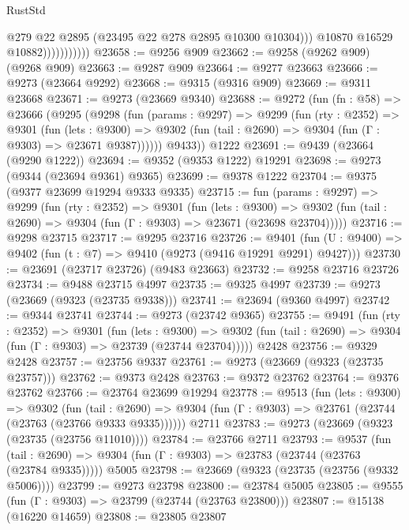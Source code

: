 \begin{lexlean}{RustStd}
\begin{coremodule}
                              @279
                              @22
                              @2895
                              (@23495 @22 @278 @2895 @10300 @10304)))
                          @10870
                          @16529
                          @10882)))))))))))
@23658 := @9256 @909
@23662 := @9258 (@9262 @909) (@9268 @909)
@23663 := @9287 @909
@23664 := @9277 @23663
@23666 := @9273 (@23664 @9292)
@23668 := @9315 (@9316 @909)
@23669 := @9311 @23668
@23671 := @9273 (@23669 @9340)
@23688 := @9272
    (fun (fn : @58) =>
    @23666
      (@9295
        (@9298
          (fun (params : @9297) =>
          @9299
            (fun (rty : @2352) =>
            @9301
              (fun (lets : @9300) =>
              @9302 (fun (tail : @2690) => @9304 (fun (Γ : @9303) => @23671 @9387))))))
        @9433))
    @1222
@23691 := @9439 (@23664 (@9290 @1222))
@23694 := @9352 (@9353 @1222) @19291
@23698 := @9273 (@9344 (@23694 @9361) @9365)
@23699 := @9378 @1222
@23704 := @9375 (@9377 @23699 @19294 @9333 @9335)
@23715 := fun (params : @9297) =>
  @9299
    (fun (rty : @2352) =>
    @9301
      (fun (lets : @9300) =>
      @9302 (fun (tail : @2690) => @9304 (fun (Γ : @9303) => @23671 (@23698 @23704)))))
@23716 := @9298 @23715
@23717 := @9295 @23716
@23726 := @9401
    (fun (U : @9400) => @9402 (fun (t : @7) => @9410 (@9273 (@9416 @19291 @9291) @9427)))
@23730 := @23691 (@23717 @23726) (@9483 @23663)
@23732 := @9258 @23716 @23726
@23734 := @9488 @23715 @4997
@23735 := @9325 @4997
@23739 := @9273 (@23669 (@9323 (@23735 @9338)))
@23741 := @23694 (@9360 @4997)
@23742 := @9344 @23741
@23744 := @9273 (@23742 @9365)
@23755 := @9491
    (fun (rty : @2352) =>
    @9301
      (fun (lets : @9300) =>
      @9302 (fun (tail : @2690) => @9304 (fun (Γ : @9303) => @23739 (@23744 @23704)))))
    @2428
@23756 := @9329 @2428
@23757 := @23756 @9337
@23761 := @9273 (@23669 (@9323 (@23735 @23757)))
@23762 := @9373 @2428
@23763 := @9372 @23762
@23764 := @9376 @23762
@23766 := @23764 @23699 @19294
@23778 := @9513
    (fun (lets : @9300) =>
    @9302
      (fun (tail : @2690) =>
      @9304 (fun (Γ : @9303) => @23761 (@23744 (@23763 (@23766 @9333 @9335))))))
    @2711
@23783 := @9273 (@23669 (@9323 (@23735 (@23756 @11010))))
@23784 := @23766 @2711
@23793 := @9537
    (fun (tail : @2690) => @9304 (fun (Γ : @9303) => @23783 (@23744 (@23763 (@23784 @9335)))))
    @5005
@23798 := @23669 (@9323 (@23735 (@23756 (@9332 @5006))))
@23799 := @9273 @23798
@23800 := @23784 @5005
@23805 := @9555 (fun (Γ : @9303) => @23799 (@23744 (@23763 @23800)))
@23807 := @15138 (@16220 @14659)
@23808 := @23805 @23807

\end{coremodule}
\end{lexlean}
